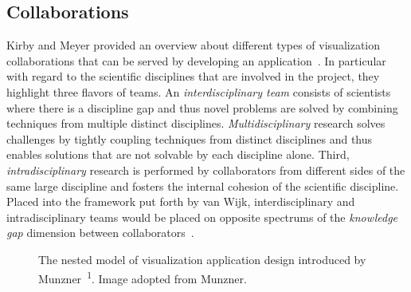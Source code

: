 \subsection{Collaborations} \label{cha:intro:appl:collab}
Kirby and Meyer provided an overview about different types of visualization collaborations that can be served by developing an application~\cite{kirby2013visualization}.  In particular with regard to the scientific disciplines that are involved in the project, they highlight three flavors of teams. An \emph{interdisciplinary team} consists of scientists where there is a discipline gap and thus novel problems are solved by combining techniques from multiple distinct disciplines.  \emph{Multidisciplinary} research solves challenges by tightly coupling techniques from distinct disciplines and thus enables solutions that are not solvable by each discipline alone.  Third, \emph{intradisciplinary} research is performed by collaborators from different sides of the same large discipline and fosters the internal cohesion of the scientific discipline.  Placed into the framework put forth by van Wijk, interdisciplinary and intradisciplinary teams would be placed on opposite spectrums of the \emph{knowledge gap} dimension between collaborators~\cite{van2006bridging}.

\begin{figure}
  \centering
  \caption{The nested model of visualization application design introduced by Munzner~\cite{munzner2009nested}\textsuperscript{1}.  Image adopted from Munzner.}
  \label{fig:intro:appl:nested}
\end{figure}


